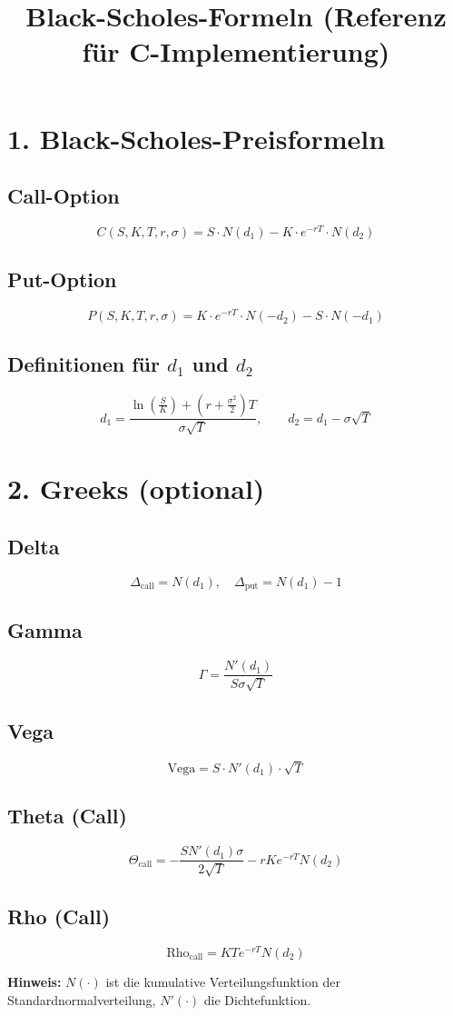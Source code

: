 \documentclass[a4paper,12pt]{article}
\title{Black-Scholes-Formeln (Referenz f\"ur C-Implementierung)}
\author{}
\date{}
\begin{document}
\maketitle

\section*{1. Black-Scholes-Preisformeln}

\subsection*{Call-Option}
\[
C(S, K, T, r, \sigma) = S \cdot N(d_1) - K \cdot e^{-rT} \cdot N(d_2)
\]

\subsection*{Put-Option}
\[
P(S, K, T, r, \sigma) = K \cdot e^{-rT} \cdot N(-d_2) - S \cdot N(-d_1)
\]

\subsection*{Definitionen f\"ur \( d_1 \) und \( d_2 \)}
\[
d_1 = \frac{\ln\left(\frac{S}{K}\right) + \left(r + \frac{\sigma^2}{2}\right) T}{\sigma \sqrt{T}}, \quad
\quad d_2 = d_1 - \sigma \sqrt{T}
\]

\section*{2. Greeks (optional)}

\subsection*{Delta}
\[
\Delta_{\text{call}} = N(d_1), \quad \Delta_{\text{put}} = N(d_1) - 1
\]

\subsection*{Gamma}
\[
\Gamma = \frac{N'(d_1)}{S \sigma \sqrt{T}}
\]

\subsection*{Vega}
\[
\text{Vega} = S \cdot N'(d_1) \cdot \sqrt{T}
\]

\subsection*{Theta (Call)}
\[
\Theta_{\text{call}} = -\frac{S N'(d_1) \sigma}{2\sqrt{T}} - rK e^{-rT} N(d_2)
\]

\subsection*{Rho (Call)}
\[
\text{Rho}_{\text{call}} = K T e^{-rT} N(d_2)
\]

\vfill
\textbf{Hinweis:} \( N(\cdot) \) ist die kumulative Verteilungsfunktion der Standardnormalverteilung, \( N'(\cdot) \) die Dichtefunktion.
\end{document}
